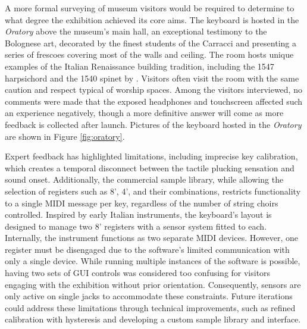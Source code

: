 A more formal surveying of museum visitors would be required to determine to what degree the exhibition achieved its core aims.
The keyboard is hosted in the \emph{Oratory} above the museum's main hall, an exceptional testimony to the Bolognese art, decorated by the finest students of the Carracci and presenting a series of frescoes covering most of the walls and ceiling. The room hosts unique examples of the Italian Renaissance building tradition, including the 1547 harpsichord and the 1540 spinet by . Visitors often visit the room with the same caution and respect typical of worship spaces. Among the visitors interviewed, no comments were made that the exposed headphones and touchscreen affected such an experience negatively, though a more definitive answer will come as more feedback is collected after launch. Pictures of the keyboard hosted in the \emph{Oratory} are shown in Figure \ref{fig:oratory}.

Expert feedback has highlighted limitations, including imprecise key calibration, which creates a temporal disconnect between the tactile plucking sensation and sound onset. Additionally, the commercial sample library, while allowing the selection of registers such as 8', 4', and their combinations, restricts functionality to a single MIDI message per key, regardless of the number of string choirs controlled. Inspired by early Italian instruments, the keyboard's layout is designed to manage two 8' registers with a sensor system fitted to each. Internally, the instrument functions as two separate MIDI devices. However, one register must be disengaged due to the software's limited communication with only a single device. While running multiple instances of the software is possible, having two sets of GUI controls was considered too confusing for visitors engaging with the exhibition without prior orientation. Consequently, sensors are only active on single jacks to accommodate these constraints. Future iterations could address these limitations through technical improvements, such as refined calibration with hysteresis and developing a custom sample library and interface.


